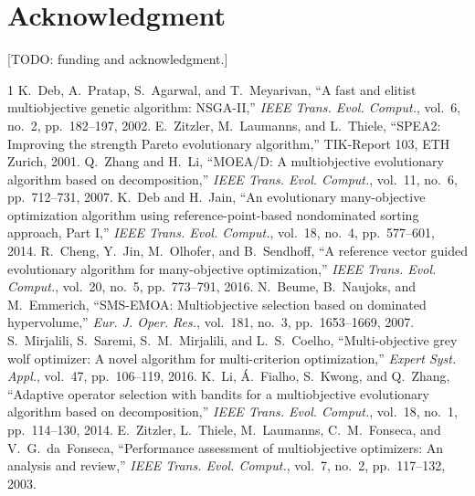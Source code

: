 \documentclass[journal]{IEEEtran}
\begin{document}
\section*{Acknowledgment}
[TODO: funding and acknowledgment.]

% 
% 

\begin{thebibliography}{1}
 K.~Deb, A.~Pratap, S.~Agarwal, and T.~Meyarivan, ``A fast and elitist multiobjective genetic algorithm: NSGA-II,'' \emph{IEEE Trans. Evol. Comput.}, vol.~6, no.~2, pp.~182--197, 2002.
 E.~Zitzler, M.~Laumanns, and L.~Thiele, ``SPEA2: Improving the strength Pareto evolutionary algorithm,'' TIK-Report 103, ETH Zurich, 2001.
 Q.~Zhang and H.~Li, ``MOEA/D: A multiobjective evolutionary algorithm based on decomposition,'' \emph{IEEE Trans. Evol. Comput.}, vol.~11, no.~6, pp.~712--731, 2007.
 K.~Deb and H.~Jain, ``An evolutionary many-objective optimization algorithm using reference-point-based nondominated sorting approach, Part I,'' \emph{IEEE Trans. Evol. Comput.}, vol.~18, no.~4, pp.~577--601, 2014.
 R.~Cheng, Y.~Jin, M.~Olhofer, and B.~Sendhoff, ``A reference vector guided evolutionary algorithm for many-objective optimization,'' \emph{IEEE Trans. Evol. Comput.}, vol.~20, no.~5, pp.~773--791, 2016.
 N.~Beume, B.~Naujoks, and M.~Emmerich, ``SMS-EMOA: Multiobjective selection based on dominated hypervolume,'' \emph{Eur. J. Oper. Res.}, vol.~181, no.~3, pp.~1653--1669, 2007.
 S.~Mirjalili, S.~Saremi, S.~M.~Mirjalili, and L.~S.~Coelho, ``Multi-objective grey wolf optimizer: A novel algorithm for multi-criterion optimization,'' \emph{Expert Syst. Appl.}, vol.~47, pp.~106--119, 2016.
 K.~Li, \'A.~Fialho, S.~Kwong, and Q.~Zhang, ``Adaptive operator selection with bandits for a multiobjective evolutionary algorithm based on decomposition,'' \emph{IEEE Trans. Evol. Comput.}, vol.~18, no.~1, pp.~114--130, 2014.
 E.~Zitzler, L.~Thiele, M.~Laumanns, C.~M.~Fonseca, and V.~G.~da~Fonseca, ``Performance assessment of multiobjective optimizers: An analysis and review,'' \emph{IEEE Trans. Evol. Comput.}, vol.~7, no.~2, pp.~117--132, 2003.
\end{thebibliography}
\end{document}
